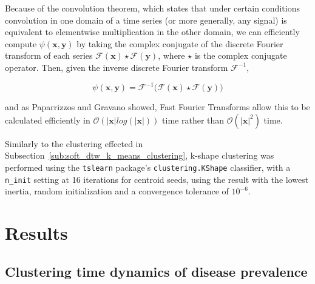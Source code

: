\documentclass{article}
\begin{document}
Because of the convolution theorem, which states that under certain conditions convolution in one domain of a time series (or more generally, any signal) is equivalent to elementwise multiplication in the other domain,\cite{oppenheim2001discrete} we can efficiently compute $\psi(\mathbf{x}, \mathbf{y})$ by taking the complex conjugate of the discrete Fourier transform of each series $\mathcal{F}(\mathbf{x}) \star \mathcal{F}(\mathbf{y})$, where $\star$ is the complex conjugate operator.\cite{paparrizos2015k} Then, given the inverse discrete Fourier transform $\mathcal{F}^{-1}$,

\begin{equation}
	\psi(\mathbf{x}, \mathbf{y}) = \mathcal{F}^{-1} \Big( \mathcal{F}(\mathbf{x}) \star \mathcal{F}(\mathbf{y}) \Big)
\end{equation}

\noindent and as Paparrizzos and Gravano showed, Fast Fourier Transforms allow this to be calculated efficiently in $\mathcal{O}(|\mathbf{x}| log(|\mathbf{x}|))$ time rather than $\mathcal{O}(|\mathbf{x}|^2)$ time.

Similarly to the clustering effected in Subsection~\ref{sub:soft_dtw_k_means_clustering}, k-shape clustering was performed using the \texttt{tslearn} package's \texttt{clustering.KShape} classifier, with a \texttt{n\_init} setting at 16 iterations for centroid seeds, using the result with the lowest inertia, random initialization and a convergence tolerance of $10^{-6}$.



\section{Results} %
\label{sec:results}

\subsection{Clustering time dynamics of disease prevalence} %
\label{sub:clustering_time_dynamics_of_disease_prevalence}
\end{document}
